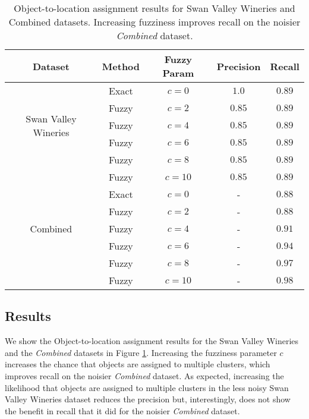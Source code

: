\small{
\begin{table}[h!]
    \begin{center}
        \begin{tabular}{ |c|c|c|c|c| } 
            \hline
            Dataset & Method & Fuzzy Param & Precision & Recall \\
            \hline
            \multirow{5}{4em}{Swan Valley Wineries} 
                & Exact & $c = 0$ & $1.0$ & $0.89$  \\ 
                & Fuzzy & $c = 2$ & $0.85$ & $0.89$  \\ 
                & Fuzzy & $c = 4$ & $0.85$ & $0.89$  \\
                & Fuzzy & $c = 6$ & $0.85$ & $0.89$  \\ 
                & Fuzzy & $c = 8$ & $0.85$ & $0.89$  \\ 
                & Fuzzy & $c = 10$ & $0.85$ & $0.89$  \\ 
            \hline
            \multirow{5}{4em}{Combined} 
                & Exact & $c = 0$ & - & $0.88$  \\ 
                & Fuzzy & $c = 2$ & - & $0.88$  \\ 
                & Fuzzy & $c = 4$ & - & $0.91$  \\ 
                & Fuzzy & $c = 6$ & - & $0.94$  \\ 
                & Fuzzy & $c = 8$ & - & $0.97$  \\ 
                & Fuzzy & $c = 10$ & - & $0.98$  \\ 
            \hline
        \end{tabular}
        \caption{ Object-to-location assignment results for Swan Valley Wineries and Combined datasets. Increasing fuzziness improves recall on the noisier \textit{Combined} dataset.} %
        \label{table:clustering}
    \end{center}
\end{table}
}


\subsection{Results}
We show the Object-to-location assignment results for the Swan Valley Wineries and the \textit{Combined} datasets in Figure \ref{table:clustering}. 
Increasing the fuzziness parameter $c$ increases the chance that objects are assigned to multiple clusters, which improves recall on the noisier \textit{Combined} dataset.
As expected, increasing the likelihood that objects are assigned to multiple clusters in the less noisy Swan Valley Wineries dataset reduces the precision but, interestingly, does not show the benefit in recall that it did for the noisier \textit{Combined} dataset.

